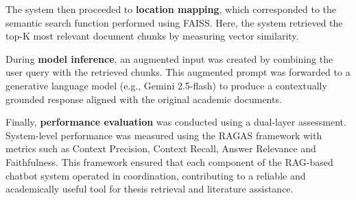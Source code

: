 \begin{refsection}
The system then proceeded to \textbf{location mapping}, which corresponded to the semantic search function performed using FAISS. Here, the system retrieved the top-K most relevant document chunks by measuring vector similarity.

During \textbf{model inference}, an augmented input was created by combining the user query with the retrieved chunks. This augmented prompt was forwarded to a generative language model (e.g., Gemini 2.5-flash) to produce a contextually grounded response aligned with the original academic documents.

Finally, \textbf{performance evaluation} was conducted using a dual-layer assessment. System-level performance was measured using the RAGAS framework with metrics such as Context Precision, Context Recall, Answer Relevance and Faithfulness. This framework ensured that each component of the RAG-based chatbot system operated in coordination, contributing to a reliable and academically useful tool for thesis retrieval and literature assistance.

\clearpage

\printbibliography[heading=subbibintoc, title={\centering Notes}]
\end{refsection}
